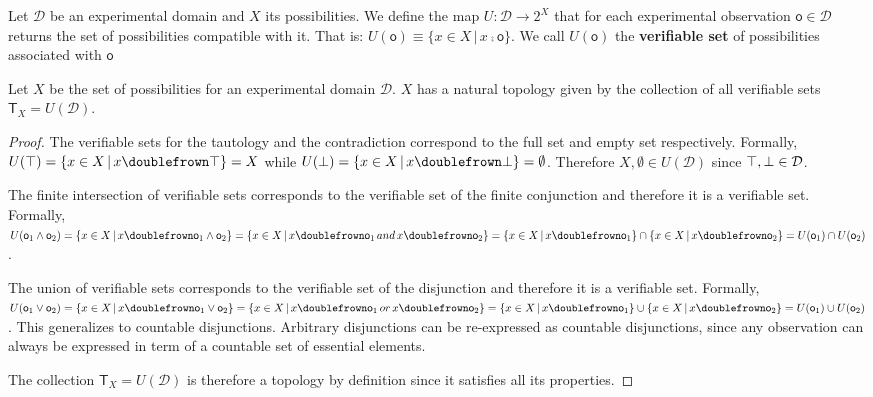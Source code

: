 \documentclass[11pt,letterpaper,fleqn]{memoir} %
\begin{document}
\begin{mathSection}
	
\begin{defn}
	Let $\mathcal{D}$ be an experimental domain and $X$ its possibilities. We define the map $U : \mathcal{D} \rightarrow 2^X$ that for each experimental observation $\mathsf{o} \in \mathcal{D}$ returns the set of possibilities compatible with it. That is: $U(\mathsf{o})\equiv\{ x \in X \, | \, x \comp \mathsf{o}\}$. We call $U(\mathsf{o})$ the \textbf{verifiable set} of possibilities associated with $\mathsf{o}$
\end{defn}

\begin{prop}
	Let $X$ be the set of possibilities for an experimental domain $\mathcal{D}$. $X$ has a natural topology given by the collection of all verifiable sets $\mathsf{T}_X=U(\mathcal{D})$.
\end{prop}

\begin{proof}
	The verifiable sets for the tautology and the contradiction correspond to the full set and empty set respectively. Formally, $U(\tautology) = \{ x \in X \, | \, x \comp \tautology\} = X$ while $U(\contradiction) = \{ x \in X \, | \, x \comp \contradiction\} = \emptyset$. Therefore $X, \emptyset \in U(\mathcal{D})$ since $\top, \bot \in \mathcal{D}$.

	The finite intersection of verifiable sets corresponds to the verifiable set of the finite conjunction and therefore it is a verifiable set. Formally, $U(\obs_1\AND\obs_2) = \{ x \in X \, | \, x \comp \obs_1\AND\obs_2\} =  \{ x \in X \, | \, x \comp \obs_1 \, and \, x \comp \obs_2\} = \{ x \in X \, | \, x \comp \obs_1\} \cap \{ x \in X \, | \, x \comp \obs_2\} = U(\obs_1) \cap U(\obs_2)$.

	The union of verifiable sets corresponds to the verifiable set of the disjunction and therefore it is a verifiable set. Formally, $U(\obs_1\OR\obs_2) = \{ x \in X \, | \, x \comp \obs_1\OR\obs_2\} =  \{ x \in X \, | \, x \comp \obs_1 \, or \, x \comp \obs_2\} = \{ x \in X \, | \, x \comp \obs_1\} \cup \{ x \in X \, | \, x \comp \obs_2\} = U(\obs_1) \cup U(\obs_2)$. This generalizes to countable disjunctions. Arbitrary disjunctions can be re-expressed as countable disjunctions, since any observation can always be expressed in term of a countable set of essential elements.

	The collection $\mathsf{T}_X=U(\mathcal{D})$ is therefore a topology by definition since it satisfies all its properties.
\end{proof}
\end{mathSection}
\end{document}
